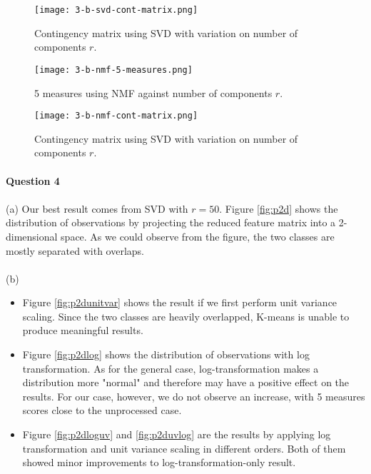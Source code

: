 \begin{figure}[H]
	\centering
	\texttt{[image: 3-b-svd-cont-matrix.png]}
	\caption{Contingency matrix using SVD with variation on number of components $r$.}
	\label{fig:svdcm}
\end{figure}

\begin{figure}[H]
	\centering
	\texttt{[image: 3-b-nmf-5-measures.png]}
	\caption{5 measures using NMF against number of components $r$. }
	\label{fig:nmf5}
\end{figure}

\begin{figure}[H]
	\centering
	\texttt{[image: 3-b-nmf-cont-matrix.png]}
	\caption{Contingency matrix using SVD with variation on number of components $r$.}
	\label{fig:nmfcm}
\end{figure}


\paragraph{Question 4} 
\paragraph{} (a) Our best result comes from SVD with $r=50$. Figure \ref{fig:p2d} shows the distribution of observations by projecting the reduced feature matrix into a 2-dimensional space. As we could observe from the figure, the two classes are mostly separated with overlaps. 

\paragraph{} (b)
\begin{itemize}
	\setlength{\itemsep}{0pt}
	\item Figure \ref{fig:p2dunitvar} shows the result if we first perform unit variance scaling. Since the two classes are heavily overlapped, K-means is unable to produce meaningful results.
	\item Figure \ref{fig:p2dlog} shows the distribution of observations with log transformation. As for the general case, log-transformation makes a distribution more "normal" and therefore may have a positive effect on the results. For our case, however, we do not observe an increase, with 5 measures scores close to the unprocessed case. 
	\item Figure \ref{fig:p2dloguv} and \ref{fig:p2duvlog} are the results by applying log transformation and unit variance scaling in different orders. Both of them showed minor improvements to log-transformation-only result. 
\end{itemize}
  

